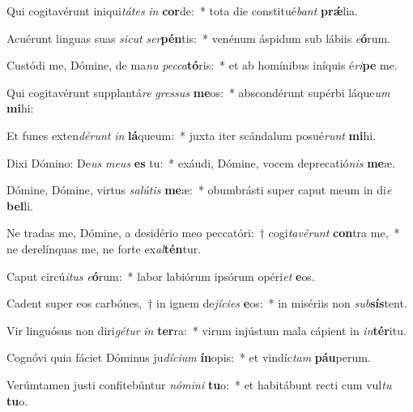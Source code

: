 \item Qui cogitavérunt iniqui\textit{tá}\textit{tes} \textit{in} \textbf{cor}de:~* tota die constitué\textit{bant} \textbf{prǽ}lia.
\item Acuérunt linguas suas \textit{sic}\textit{ut} \textit{ser}\textbf{pén}tis:~* venénum áspidum sub lábiis \textit{e}\textbf{ó}rum.
\item Custódi me, Dómine, de ma\textit{nu} \textit{pec}\textit{ca}\textbf{tó}ris:~* et ab homínibus iníquis é\textit{ri}\textbf{pe} me.
\item Qui cogitavérunt supplantá\textit{re} \textit{gres}\textit{sus} \textbf{me}os:~* abscondérunt supérbi láque\textit{um} \textbf{mi}hi:
\item Et funes exten\textit{dé}\textit{runt} \textit{in} \textbf{lá}queum:~* juxta iter scándalum posué\textit{runt} \textbf{mi}hi.
\item Dixi Dómino: De\textit{us} \textit{me}\textit{us} \textbf{es} tu:~* exáudi, Dómine, vocem deprecatió\textit{nis} \textbf{me}æ.
\item Dómine, Dómine, virtus \textit{sa}\textit{lú}\textit{tis} \textbf{me}æ:~* obumbrásti super caput meum in di\textit{e} \textbf{bel}li.
\item Ne tradas me, Dómine, a desidério meo peccatóri:~† cogi\textit{ta}\textit{vé}\textit{runt} \textbf{con}tra me,~* ne derelínquas me, ne forte ex\textit{al}\textbf{tén}tur.
\item Caput circú\textit{i}\textit{tus} \textit{e}\textbf{ó}rum:~* labor labiórum ipsórum opéri\textit{et} \textbf{e}os.
\item Cadent super eos carbónes,~† in ignem de\textit{jí}\textit{ci}\textit{es} \textbf{e}os:~* in misériis non \textit{sub}\textbf{sís}tent.
\item Vir linguósus non diri\textit{gé}\textit{tur} \textit{in} \textbf{ter}ra:~* virum injústum mala cápient in \textit{in}\textbf{tér}itu.
\item Cognóvi quia fáciet Dóminus ju\textit{dí}\textit{ci}\textit{um} \textbf{ín}opis:~* et vindíc\textit{tam} \textbf{páu}perum.
\item Verúmtamen justi confitebúntur \textit{nó}\textit{mi}\textit{ni} \textbf{tu}o:~* et habitábunt recti cum vul\textit{tu} \textbf{tu}o.
